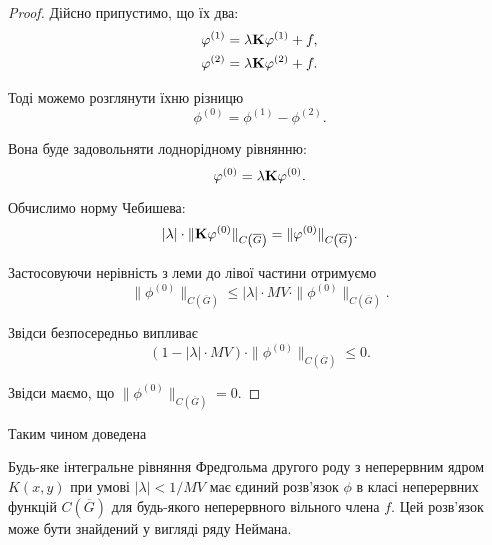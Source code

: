 \begin{proof}
	Дійсно припустимо, що їх два:
	\begin{equation}
		\begin{aligned}
			\phi^{(1)} &= \lambda \bf{K} \phi^{(1)} + f, \\
			\phi^{(2)} &= \lambda \bf{K} \phi^{(2)} + f.
		\end{aligned}
	\end{equation}

	Тоді можемо розглянути їхню різницю
	\begin{equation}
		\phi^{(0)} = \phi^{(1)} - \phi^{(2)}.
	\end{equation}

	Вона буде задовольняти лоднорідному рівнянню:
	\begin{equation}
		\phi^{(0)} = \lambda \bf{K} \phi^{(0)}.
	\end{equation}

	Обчислимо норму Чебишева:
	\begin{equation}
		|\lambda| \cdot \|\bf{K} \phi^{(0)}\|_{C\left(\overline G\right)} = \| \phi^{(0)} \|_{C\left(\overline G\right)}.
	\end{equation}

	Застосовуючи нерівність з леми до лівої частини отримуємо
	\begin{equation}
		\| \phi^{(0)} \|_{C\left(\overline G\right)} \le |\lambda| \cdot MV \cdot \|\phi^{(0)}\|_{C\left(\overline G\right)}.
	\end{equation}

	Звідси безпосередньо випливає
	\begin{equation}
		(1 - |\lambda| \cdot MV) \cdot \|\phi^{(0)}\|_{C\left(\overline G\right)} \le 0.
	\end{equation}

	Звідси маємо, що $\|\phi^{(0)}\|_{C\left(\overline G\right)} = 0$.
\end{proof}

Таким чином доведена
\begin{theorem}
	Будь-яке інтегральне рівняння Фредгольма другого роду з неперервним ядром $K(x, y)$ при умові $|\lambda| < 1 / MV$ має єдиний розв'язок $\phi$ в класі неперервних функцій $C\left(\overline G\right)$ для будь-якого неперервного вільного члена $f$. Цей роз\-в'я\-зок може бути знайдений у вигляді ряду Неймана.
\end{theorem}

